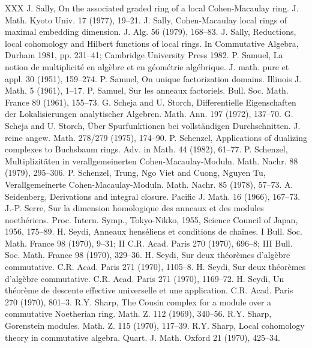 \begin{thebibliography}{XXX}
 J. Sally, On the associated graded ring of a local Cohen-Macaulay ring. J. Math. Kyoto Univ. 17 (1977), 19--21.
 J. Sally, Cohen-Macaulay local rings of maximal embedding dimension. J. Alg. 56 (1979), 168--83.
 J. Sally, Reductions, local cohomology and Hilbert functions of local rings. In Commutative Algebra, Durham 1981, pp. 231--41; Cambridge University Press 1982.
 P. Samuel, La notion de multiplicit\'e en alg\`ebre et en g\'eom\'etrie alg\'ebrique. J. math. pure et appl. 30 (1951), 159--274.
 P. Samuel, On unique factorization domains. Illinois J. Math. 5 (1961), 1--17.
 P. Samuel, Sur les anneaux factoriels. Bull. Soc. Math. France 89 (1961), 155--73.
 G. Scheja and U. Storch, Differentielle Eigenschaften der Lokalisierungen analytischer Algebren. Math. Ann. 197 (1972), 137--70.
 G. Scheja and U. Storch, \"Uber Spurfunktionen bei vollst\"andigen Durchschnitten. J. reine angew. Math. 278/279 (1975), 174--90.
 P. Schenzel, Applications of dualizing complexes to Buchsbaum rings. Adv. in Math. 44 (1982), 61--77.
 P. Schenzel, Multiplizit\"aten in verallgemeinerten Cohen-Macaulay-Moduln. Math. Nachr. 88 (1979), 295--306.
 P. Schenzel, Trung, Ngo Viet and Cuong, Nguyen Tu, Verallgemeinerte Cohen-Macaulay-Moduln. Math. Nachr. 85 (1978), 57--73.
 A. Seidenberg, Derivations and integral closure. Pacific J. Math. 16 (1966), 167--73.
 J.-P. Serre, Sur la dimension homologique des anneaux et des modules noeth\'eriens. Proc. Intern. Symp., Tokyo-Nikko, 1955, Science Council of Japan, 1956, 175--89.
 H. Seydi, Anneaux hens\'eliens et conditions de cha\^ines. I Bull. Soc. Math. France 98 (1970), 9--31; II C.R. Acad. Paris 270 (1970), 696--8; III Bull. Soc. Math. France 98 (1970), 329--36.
 H. Seydi, Sur deux th\'eor\`emes d'alg\`ebre commutative. C.R. Acad. Paris 271 (1970), 1105--8.
 H. Seydi, Sur deux th\'eor\`emes d'alg\`ebre commutative. C.R. Acad. Paris 271 (1970), 1169--72.
 H. Seydi, Un th\'eor\`eme de descente effective universelle et une application. C.R. Acad. Paris 270 (1970), 801--3.
 R.Y. Sharp, The Cousin complex for a module over a commutative Noetherian ring. Math. Z. 112 (1969), 340--56.
 R.Y. Sharp, Gorenstein modules. Math. Z. 115 (1970), 117--39.
 R.Y. Sharp, Local cohomology theory in commutative algebra. Quart. J. Math. Oxford 21 (1970), 425--34.

\end{thebibliography}
